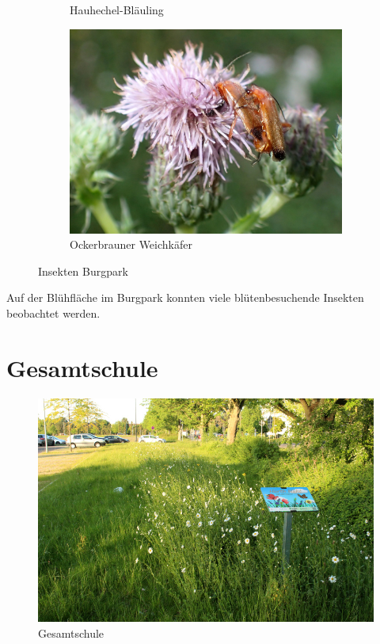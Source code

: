\documentclass[10pt]{article}
\begin{document}
\begin{figure}[h!]
\begin{subfigure}[b]{0.48\linewidth}
    \caption{Hauhechel-Bläuling}
  \end{subfigure}
  \begin{subfigure}[b]{0.43\linewidth}
    \includegraphics[width=\linewidth]{img/weichkaefer.jpg}
    \caption{Ockerbrauner Weichkäfer}
  \end{subfigure}
  \caption{Insekten Burgpark}
\end{figure}

Auf der Blühfläche im Burgpark konnten viele blütenbesuchende Insekten beobachtet werden.

\newpage
\section{Gesamtschule}
\begin{figure}[h!]
  \includegraphics[width=\linewidth]{img/gesamtschule/mai.jpg}
  \caption{Gesamtschule}
  \label{fig:boat1}
\end{figure}
\end{document}
